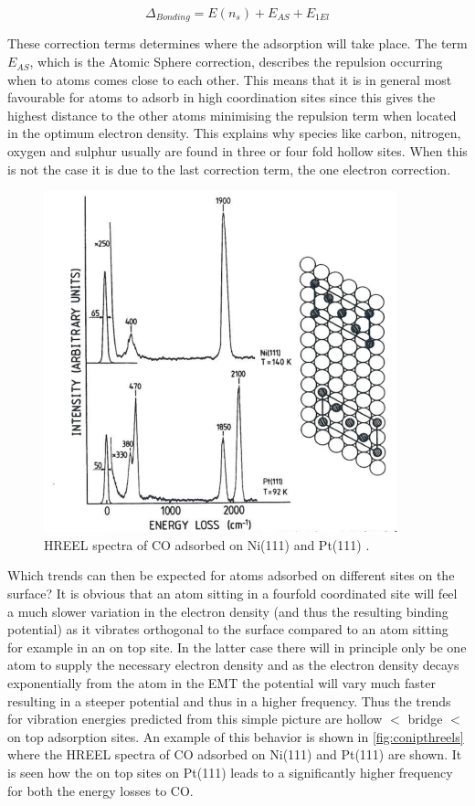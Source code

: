 \begin{equation}
\Delta_{Bonding}=E(n_s)+E_{AS}+E_{1El}
\end{equation}

These correction terms determines where the adsorption will take place. The term $E_{AS}$, which is the Atomic Sphere correction, describes the repulsion occurring when to atoms comes close to each other. This means that it is in general most favourable for atoms to adsorb in high coordination sites since this gives the highest distance to the other atoms  minimising the repulsion term when located in the optimum electron density. This explains why species like carbon, nitrogen, oxygen and sulphur usually are found in three or four fold hollow sites. When this is not the case it is due to the last  correction term, the one electron correction.

\begin{figure}[h!]
	\begin{center}
	\includegraphics[scale=4]{figures/08_07.png}
	\caption{HREEL spectra of CO adsorbed on Ni(111) and Pt(111) \cite{Ibach}.}
	\label{fig:conipthreels}
	\end{center}
\end{figure}

Which trends can then be expected for atoms adsorbed on different sites on the surface? It is obvious that an atom sitting in a fourfold coordinated site will feel a much slower variation in the electron density (and thus the resulting binding potential) as it vibrates orthogonal to the surface compared to an atom sitting for example in an  on top site. In the  latter case there will in principle  only be  one atom to supply the necessary electron density and as the electron density decays exponentially from the atom in the EMT the potential will vary much faster resulting in a steeper potential and thus in a higher frequency.  Thus the trends for vibration energies  predicted from this simple picture are hollow $<$ bridge $<$ on top adsorption sites.
An example of this behavior is shown in \autoref{fig:conipthreels} where the HREEL spectra of CO adsorbed on Ni(111) and Pt(111) are shown.  It is seen how the on top sites on Pt(111) leads to a significantly higher frequency for both the energy losses to CO.

